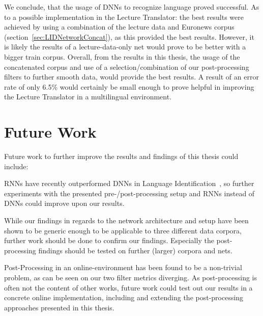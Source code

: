 We conclude, that the usage of DNNs to recognize language proved successful. As to a possible implementation in the Lecture Translator: the best results were achieved by using a combination of the lecture data and Euronews corpus (section~\ref{sec:LIDNetworkConcat}), as this provided the best results. However, it is likely the results of a lecture-data-only net would prove to be better with a bigger train corpus. Overall, from the results in this thesis, the usage of the concatenated corpus and use of a selection/combination of our post-processing filters to further smooth data, would provide the best results. A result of an error rate of only 6.5\% would certainly be small enough to prove helpful in improving the Lecture Translator in a multilingual environment.

\section{Future Work}
\label{sec:fw}

Future work to further improve the results and findings of this thesis could include:

RNNs have recently outperformed DNNs in Language Identification~\cite{gonzalez2014automatic}, so further experiments with the presented pre-/post-processing setup and RNNs instead of DNNs could improve upon our results.

While our findings in regards to the network architecture and setup have been shown to be generic enough to be applicable to three different data corpora, further work should be done to confirm our findings. Especially the post-processing findings should be tested on further (larger) corpora and nets.

Post-Processing in an online-environment has been found to be a non-trivial problem, as can be seen on our two filter metrics diverging. As post-processing is often not the content of other works, future work could test out our results in a concrete online implementation, including and extending the post-processing approaches presented in this thesis.